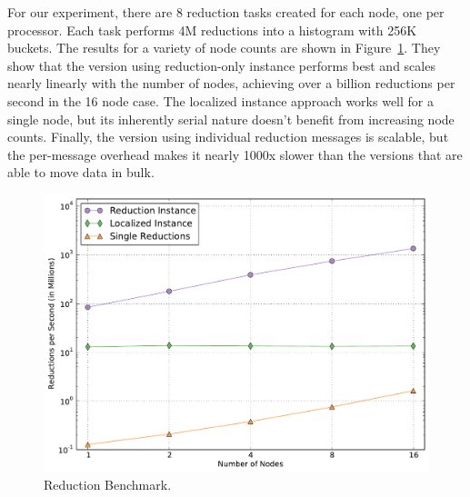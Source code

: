 For our experiment, there are 8 reduction tasks created for each node, one per processor.  Each task performs 4M reductions
into a histogram with 256K buckets.  The results for a variety of node counts are shown in Figure~\ref{fig:reducbench}.
They show that the version using reduction-only instance performs 
best and scales nearly linearly with the number of nodes, achieving over a billion reductions
per second in the 16 node case.  The localized instance approach works well for a single node, 
but its inherently serial nature doesn't benefit from increasing node counts.  Finally, the version using individual
reduction messages is scalable, but the per-message overhead makes it nearly 1000x slower than the versions that are
able to move data in bulk.

\begin{figure}
\begin{center}
\includegraphics[scale=0.33]{figs/reduce_simple.pdf}
\end{center}
\vspace{-2mm}
\caption{Reduction Benchmark.\label{fig:reducbench}}
\vspace{-4mm}
\end{figure}

